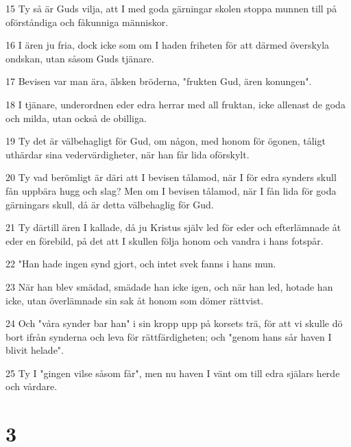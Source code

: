 \par 15 Ty så är Guds vilja, att I med goda gärningar skolen stoppa munnen till på oförståndiga och fåkunniga människor.
\par 16 I ären ju fria, dock icke som om I haden friheten för att därmed överskyla ondskan, utan såsom Guds tjänare.
\par 17 Bevisen var man ära, älsken bröderna, "frukten Gud, ären konungen".
\par 18 I tjänare, underordnen eder edra herrar med all fruktan, icke allenast de goda och milda, utan också de obilliga.
\par 19 Ty det är välbehagligt för Gud, om någon, med honom för ögonen, tåligt uthärdar sina vedervärdigheter, när han får lida oförskylt.
\par 20 Ty vad berömligt är däri att I bevisen tålamod, när I för edra synders skull fån uppbära hugg och slag? Men om I bevisen tålamod, när I fån lida för goda gärningars skull, då är detta välbehaglig för Gud.
\par 21 Ty därtill ären I kallade, då ju Kristus själv led för eder och efterlämnade åt eder en förebild, på det att I skullen följa honom och vandra i hans fotspår.
\par 22 "Han hade ingen synd gjort, och intet svek fanns i hans mun.
\par 23 När han blev smädad, smädade han icke igen, och när han led, hotade han icke, utan överlämnade sin sak åt honom som dömer rättvist.
\par 24 Och "våra synder bar han" i sin kropp upp på korsets trä, för att vi skulle dö bort ifrån synderna och leva för rättfärdigheten; och "genom hans sår haven I blivit helade".
\par 25 Ty I "gingen vilse såsom får", men nu haven I vänt om till edra själars herde och vårdare.

\chapter{3}

